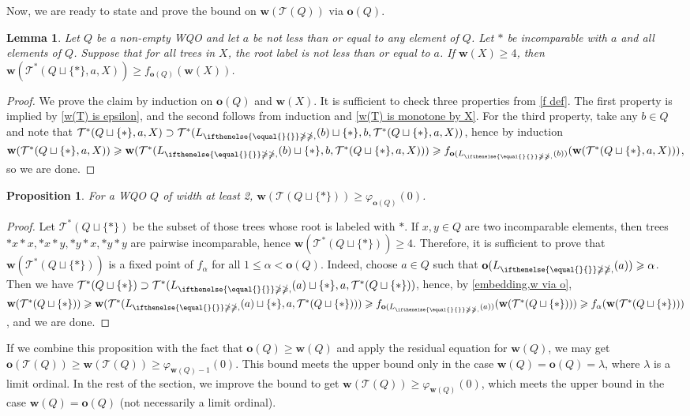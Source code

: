 \documentclass[10pt,a4paper]{amsart}
\let \leq \leqslant
\let \geq \geqslant
\let \ngeq \ngeqslant
\let \phi \varphi
\renewcommand \L [2][]{L_{\ifthenelse{\equal{#1}{}}\ngeq{\ngeq,#1}}(#2)}
\renewcommand \l [2][]{\o(\L[#1]{#2})}
\def \T {\mathcal{T}}
\def \o {\textbf{o}}
\def \w {\textbf{w}}
\newtheorem{lemma}{Lemma}
\newtheorem{proposition}{Proposition}
\begin{document}
Now, we are ready to state and prove the bound on $\w(\T(Q))$ via $\o(Q)$.

\begin{lemma}\label{w via o}
    Let $Q$ be a non-empty WQO and let $a$ be not less than or equal to any element of $Q$.
    Let $*$ be incomparable with $a$ and all elements of $Q$.
    Suppose that for all trees in $X$, the root label is not less than or equal to $a$.
    If $\w(X) \geq 4$, then $\w(\T^*(Q\sqcup\{*\}, a, X)) \geq f_{\o(Q)}(\w(X))$.
\end{lemma}
\begin{proof}
    We prove the claim by induction on $\o(Q)$ and $\w(X)$. It is sufficient to check three properties from \cref{f def}.
    The first property is implied by \cref{w(T) is epsilon}, and the second follows from induction and \cref{w(T) is monotone by X}. For the third property, take any $b \in Q$ and note that $\T^*(Q\sqcup\{*\}, a, X) \supset \T^*(\L{b}\sqcup\{*\}, b, \T^*(Q\sqcup\{*\}, a, X))$, hence by induction $\w(\T^*(Q\sqcup\{*\}, a, X)) \geq \w(\T^*(\L{b}\sqcup\{*\}, b, \T^*(Q\sqcup\{*\}, a, X))) \geq f_{\l{b}}(\w(\T^*(Q\sqcup\{*\}, a, X)))$, so we are done.
\end{proof}



\begin{proposition}\label{w T(Q cup *)}
    For a WQO $Q$ of width at least 2, $\w(\T(Q \sqcup \{*\})) \geq \phi_{\o(Q)}(0)$.
\end{proposition}

\begin{proof}
    Let $\T^*(Q\sqcup\{*\})$ be the subset of those trees whose root is labeled with $*$. If $x,y \in Q$ are two incomparable elements, then trees $*x*x,*x*y,*y*x,*y*y$ are pairwise incomparable, hence $\w(\T^*(Q\sqcup\{*\})) \geq 4$. Therefore, it is sufficient to prove that $\w(\T^*(Q\sqcup\{*\}))$ is a fixed point of $f_\alpha$ for all $1 \leq \alpha < \o(Q)$.
    Indeed, choose $a \in Q$ such that $\l{a} \geq \alpha$. Then we have $\T^*(Q\sqcup\{*\}) \supset \T^*(\L{a}\sqcup\{*\}, a, \T^*(Q\sqcup\{*\}))$, hence, by \cref{embedding,w via o}, $\w(\T^*(Q\sqcup\{*\})) \geq \w(\T^*(\L{a}\sqcup\{*\}, a, \T^*(Q\sqcup\{*\}))) \geq f_{\l{a}}(\w(\T^*(Q\sqcup\{*\}))) \geq f_\alpha(\w(\T^*(Q\sqcup\{*\})))$, and we are done.
\end{proof}


If we combine this proposition with the fact that $\o(Q) \geq \w(Q)$ and apply the residual equation for $\w(Q)$, we may get $\o(\T(Q)) \geq \w(\T(Q)) \geq \phi_{\w(Q)-1}(0)$. This bound meets the upper bound only in the case $\w(Q) = \o(Q) = \lambda$, where $\lambda$ is a limit ordinal. In the rest of the section, we improve the bound to get $\w(\T(Q)) \geq \phi_{\w(Q)}(0)$, which meets the upper bound in the case $\w(Q) = \o(Q)$ (not necessarily a limit ordinal).
\end{document}
